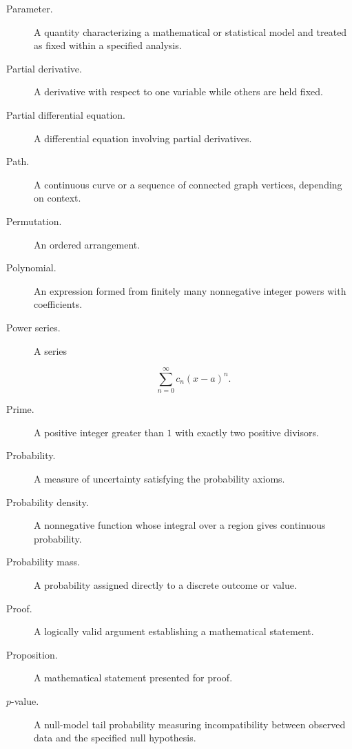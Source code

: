 \begin{description}

\item[Parameter.]
A quantity characterizing a mathematical or statistical model and treated as
fixed within a specified analysis.

\item[Partial derivative.]
A derivative with respect to one variable while others are held fixed.

\item[Partial differential equation.]
A differential equation involving partial derivatives.

\item[Path.]
A continuous curve or a sequence of connected graph vertices, depending on
context.

\item[Permutation.]
An ordered arrangement.

\item[Polynomial.]
An expression formed from finitely many nonnegative integer powers with
coefficients.

\item[Power series.]
A series

\[
\sum_{n=0}^{\infty}
c_n(x-a)^n.
\]

\item[Prime.]
A positive integer greater than \(1\) with exactly two positive divisors.

\item[Probability.]
A measure of uncertainty satisfying the probability axioms.

\item[Probability density.]
A nonnegative function whose integral over a region gives continuous
probability.

\item[Probability mass.]
A probability assigned directly to a discrete outcome or value.

\item[Proof.]
A logically valid argument establishing a mathematical statement.

\item[Proposition.]
A mathematical statement presented for proof.

\item[\(p\)-value.]
A null-model tail probability measuring incompatibility between observed data
and the specified null hypothesis.

\end{description}

